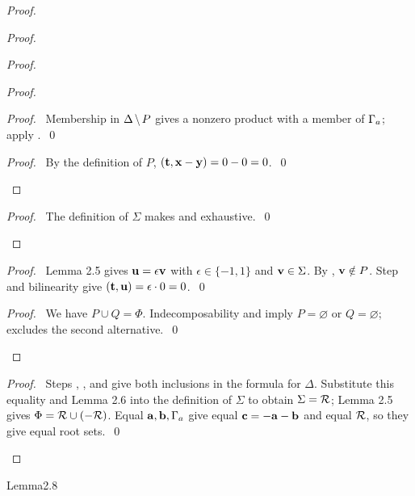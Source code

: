 \begin{proof}
\begin{proof}
\begin{proof}
\begin{proof}
\begin{proof}
     \pf\ Membership in $\Delta\mathbin{\mkern-1.5mu\setminus\mkern-1.5mu} P$ gives a nonzero product with a member of $\Gamma_a$;
     apply .~\qed
    \end{proof}
    \qedstep
    \begin{proof}\pf\ By the definition of $P$, $({\mathbf t},{\mathbf x}-{\mathbf y})=0-0=0$.~\qed\end{proof}
   \end{proof}
   \qedstep
   \begin{proof}\pf\ The definition of $\Sigma$ makes  and  exhaustive.~\qed\end{proof}
  \end{proof}
  \begin{proof}
   \pf\ Lemma 2.5 gives ${\mathbf u}=\epsilon{\mathbf v}$ with $\epsilon\in\{-1,1\}$ and
   ${\mathbf v}\in\Sigma$. By , ${\mathbf v}\notin P$.
   Step  and bilinearity give $({\mathbf t},{\mathbf u})=\epsilon\cdot0=0$.~\qed
  \end{proof}
  \qedstep
  \begin{proof}
   \pf\ We have $P\cup Q=\Phi$. Indecomposability and  imply
   $P=\varnothing$ or $Q=\varnothing$;  excludes the second alternative.~\qed
  \end{proof}
 \end{proof}
 \qedstep
 \begin{proof}
  \pf\ Steps , , and  give both
  inclusions in the formula for $\Delta$. Substitute this equality and Lemma 2.6
  into the definition of $\Sigma$ to obtain $\Sigma={\mathcal R}$; Lemma 2.5 gives
  $\Phi={\mathcal R}\cup(-{\mathcal R})$. Equal ${\mathbf a},{\mathbf b},\Gamma_a$ give equal ${\mathbf c}=-{\mathbf a}-{\mathbf b}$
  and equal ${\mathcal R}$, so they give equal root sets.~\qed
 \end{proof}
\end{proof}

\begin{cgss}{Lemma}{2.8}\label{lem:2.8}
\end{cgss}

